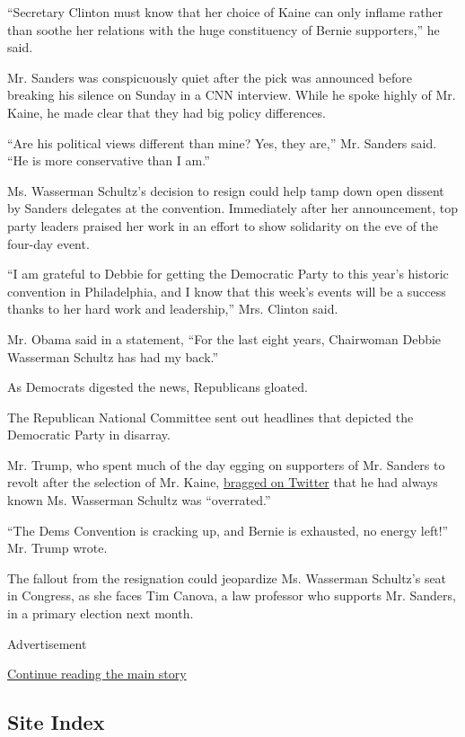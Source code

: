 ``Secretary Clinton must know that her choice of Kaine can only inflame
rather than soothe her relations with the huge constituency of Bernie
supporters,'' he said.

Mr. Sanders was conspicuously quiet after the pick was announced before
breaking his silence on Sunday in a CNN interview. While he spoke highly
of Mr. Kaine, he made clear that they had big policy differences.

``Are his political views different than mine? Yes, they are,'' Mr.
Sanders said. ``He is more conservative than I am.''

Ms. Wasserman Schultz's decision to resign could help tamp down open
dissent by Sanders delegates at the convention. Immediately after her
announcement, top party leaders praised her work in an effort to show
solidarity on the eve of the four-day event.

``I am grateful to Debbie for getting the Democratic Party to this
year's historic convention in Philadelphia, and I know that this week's
events will be a success thanks to her hard work and leadership,'' Mrs.
Clinton said.

Mr. Obama said in a statement, ``For the last eight years, Chairwoman
Debbie Wasserman Schultz has had my back.''

As Democrats digested the news, Republicans gloated.

The Republican National Committee sent out headlines that depicted the
Democratic Party in disarray.

Mr. Trump, who spent much of the day egging on supporters of Mr. Sanders
to revolt after the selection of Mr. Kaine,
\href{https://twitter.com/realDonaldTrump/status/757311921095925760?lang=en}{bragged
on Twitter} that he had always known Ms. Wasserman Schultz was
``overrated.''

``The Dems Convention is cracking up, and Bernie is exhausted, no energy
left!'' Mr. Trump wrote.

The fallout from the resignation could jeopardize Ms. Wasserman
Schultz's seat in Congress, as she faces Tim Canova, a law professor who
supports Mr. Sanders, in a primary election next month.

Advertisement

\protect\hyperlink{after-bottom}{Continue reading the main story}

\hypertarget{site-index}{%
\subsection{Site Index}\label{site-index}}

